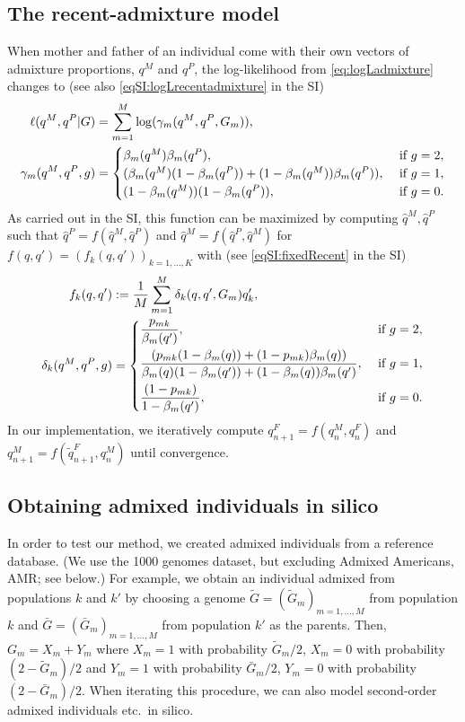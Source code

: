 \documentclass[12pt]{article}
\theoremstyle{definition}
\begin{document}
\subsection{The recent-admixture model}
When mother and father of an individual come with their own vectors of
admixture proportions, $q^M$ and $q^P$, the log-likelihood from
\eqref{eq:logLadmixture} changes to (see also
\eqref{eqSI:logLrecentadmixture} in the SI)
\begin{align}\label{eq:logLrecentadmixture}
  \ell(q^M, q^P|G) & = \sum_{m=1}^M \log( \gamma_m(q^M, q^P, G_m)),
  \\
  \notag
  \gamma_m(q^M, q^P, g) & = \begin{cases}\beta_m(q^M) \beta_m(q^P), & \text{ if }g=2,\\
    (\beta_m(q^M) (1-\beta_m(q^P))
    + (1-\beta_m(q^M)) \beta_m(q^P)), & \text{ if }g=1,\\
    (1-\beta_m(q^M))(1-\beta_m(q^P)), & \text{ if }g=0. \end{cases}
\end{align}
\sloppy As carried out in the SI, this function can be maximized by
computing $\hat q^M, \hat q^P$ such that
$\hat q^P = f(\hat q^M, \hat q^P)$ and
$\hat q^M = f(\hat q^P, \hat q^M)$ for
$f(q,q') = (f_k(q, q'))_{k=1,...,K}$ with (see
\eqref{eqSI:fixedRecent} in the SI)
\begin{align}\label{eq:fixedRecent}
  f_k(q, q') & := \frac{1}{M}\sum_{m=1}^M \delta_k(q,q', G_m) q_k',
  \\
  \notag
  \delta_k(q^M, q^P, g) & = \begin{cases}
    \displaystyle\frac{p_{mk}}{\beta_m(q')}, & \text{ if }g=2,\\[2ex]
    \displaystyle\frac{(p_{mk} (1-\beta_m(q))
      + (1-p_{mk})\beta_m(q))}{\beta_m(q)(1-\beta_m(q'))
      + (1-\beta_m(q))\beta_m(q')}, & \text{ if }g=1,\\[2ex]
    \displaystyle\frac{(1-p_{mk})}{1-\beta_m(q')}, & \text{ if }g=0. \end{cases}
\end{align}
In our implementation, we iteratively compute
$q_{n+1}^F = f(q_n^M, q_n^F)$ and
$q_{n+1}^M = f(\tilde q_{n+1}^F, q_n^M)$ until convergence.

\subsection{Obtaining admixed individuals in silico}
\label{S:insilico}
In order to test our method, we created admixed individuals from a
reference database. (We use the 1000 genomes dataset, but excluding
Admixed Americans, AMR; see below.) For example, we obtain an
individual admixed from populations $k$ and $k'$ by choosing a genome
$\tilde G = (\tilde G_m)_{m=1,...,M}$ from population $k$ and
$\bar G = (\bar G_m)_{m=1,...,M}$ from population $k'$ as the
parents. Then, $G_m = X_m + Y_m$ where $X_m = 1$ with probability
$\tilde G_m/2$, $X_m=0$ with probability $(2-\tilde G_m)/2$ and
$Y_m = 1$ with probability $\bar G_m/2$, $Y_m=0$ with probability
$(2-\bar G_m)/2$. When iterating this procedure, we can also model
second-order admixed individuals etc.\ in silico.
\end{document}
